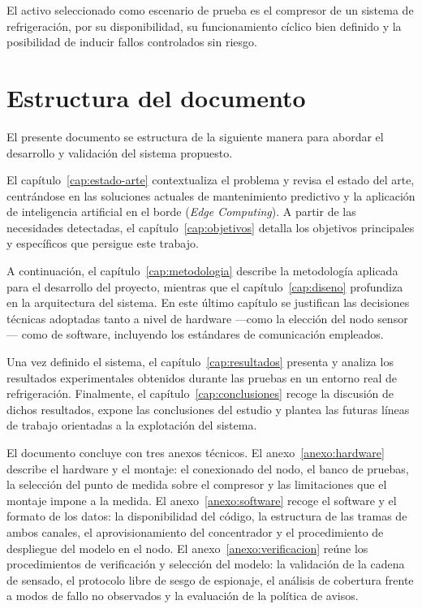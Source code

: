 El activo seleccionado como escenario de prueba es el compresor de un sistema de
refrigeración, por su disponibilidad, su funcionamiento cíclico bien definido y la
posibilidad de inducir fallos controlados sin riesgo.

\section{Estructura del documento}

El presente documento se estructura de la siguiente manera para abordar el desarrollo y
validación del sistema propuesto.

El capítulo~\ref{cap:estado-arte} contextualiza el problema y revisa el estado del arte,
centrándose en las soluciones actuales de mantenimiento predictivo y la aplicación de
inteligencia artificial en el borde (\textit{Edge Computing}). A partir de las necesidades
detectadas, el capítulo~\ref{cap:objetivos} detalla los objetivos principales y específicos que
persigue este trabajo.

A continuación, el capítulo~\ref{cap:metodologia} describe la metodología aplicada para el
desarrollo del proyecto, mientras que el capítulo~\ref{cap:diseno} profundiza en la arquitectura
del sistema. En este último capítulo se justifican las decisiones técnicas adoptadas tanto a nivel de
hardware —como la elección del nodo sensor— como de software, incluyendo los estándares de
comunicación empleados.

Una vez definido el sistema, el capítulo~\ref{cap:resultados} presenta y analiza los resultados
experimentales obtenidos durante las pruebas en un entorno real de refrigeración. Finalmente, el
capítulo~\ref{cap:conclusiones} recoge la discusión de dichos resultados, expone las conclusiones
del estudio y plantea las futuras líneas de trabajo orientadas a la explotación del sistema.

El documento concluye con tres anexos técnicos. El
anexo~\ref{anexo:hardware} describe el hardware y el montaje: el conexionado del nodo, el
banco de pruebas, la selección del punto de medida sobre el compresor y las limitaciones que el
montaje impone a la medida. El anexo~\ref{anexo:software} recoge el software y el formato de los
datos: la disponibilidad del código, la estructura de las tramas de ambos canales, el
aprovisionamiento del concentrador y el procedimiento de despliegue del modelo en el nodo. El
anexo~\ref{anexo:verificacion} reúne los procedimientos de verificación y selección del modelo: la validación de la cadena de sensado, el protocolo libre de sesgo de espionaje, el
análisis de cobertura frente a modos de fallo no observados y la evaluación de la política de
avisos.
